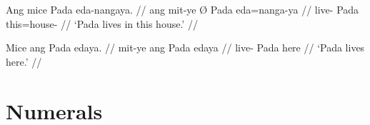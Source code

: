 \a\label{ex:edanp}\begingl
	\gla Ang mice {} Pada eda-nangaya. //
	\glb ang mit-ye Ø Pada eda=nanga-ya //
	\glc \AgtT{} live-\TsgF{} \Top{} Pada this=house-\Loc{} //
	\glft `Pada lives in this house.' //
\endgl

\a\label{ex:edanyapro}\begingl
	\gla Mice ang Pada edaya. //
	\glb mit-ye ang Pada edaya //
	\glc live-\TsgF{} \Aarg{} Pada here //
	\glft `Pada lives here.' //
\endgl

\xe



\section{Numerals}
\label{sec:numerals}


